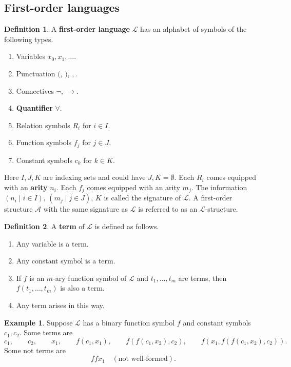 \documentclass{article}
\newcommand{\A}{\mathcal{A}}
\renewcommand{\L}{\mathcal{L}}
\newcommand{\rb}[1]{\left( #1 \right)}
\theoremstyle{definition}\newtheorem{definition}{Definition}[subsection]
\theoremstyle{definition}\newtheorem{remark}[definition]{Remark}
\theoremstyle{definition}\newtheorem*{example}{Example}
\theoremstyle{definition}\newtheorem*{note}{Note}
\begin{document}
\subsection{First-order languages}

\begin{definition}
\label{def:2.2.1}
A \textbf{first-order language} $ \L $ has an alphabet of symbols of the following types.
\begin{enumerate}
\item Variables $ x_0, x_1, \dots $.
\item Punctuation $ ( $, $ ) $, $ , $.
\item Connectives $ \neg $, $ \rightarrow $.
\item \textbf{Quantifier} $ \forall $.
\item Relation symbols $ R_i $ for $ i \in I $.
\item Function symbols $ f_j $ for $ j \in J $.
\item Constant symbols $ c_k $ for $ k \in K $.
\end{enumerate}
Here $ I, J, K $ are indexing sets and could have $ J, K = \emptyset $. Each $ R_i $ comes equipped with an \textbf{arity} $ n_i $. Each $ f_j $ comes equipped with an arity $ m_j $. The information $ \rb{n_i \mid i \in I} $, $ \rb{m_j \mid j \in J} $, $ K $ is called the signature of $ \L $. A first-order structure $ \A $ with the same signature as $ \L $ is referred to as an $ \L $-structure.
\end{definition}

\begin{definition}
A \textbf{term} of $ \L $ is defined as follows.
\begin{enumerate}
\item Any variable is a term.
\item Any constant symbol is a term.
\item If $ f $ is an $ m $-ary function symbol of $ \L $ and $ t_1, \dots, t_m $ are terms, then $ f\rb{t_1, \dots, t_m} $ is also a term.
\item Any term arises in this way.
\end{enumerate}
\end{definition}

\begin{example}
Suppose $ \L $ has a binary function symbol $ f $ and constant symbols $ c_1, c_2 $. Some terms are
$$ c_1, \qquad c_2, \qquad x_1, \qquad f\rb{c_1, x_1}, \qquad f\rb{f\rb{c_1, x_2}, c_2}, \qquad f\rb{x_1, f\rb{f\rb{c_1, x_2}, c_2}}. $$
Some not terms are
$$ ffx_1 \quad \rb{\text{not well-formed}}. $$
\end{example}
\end{document}
